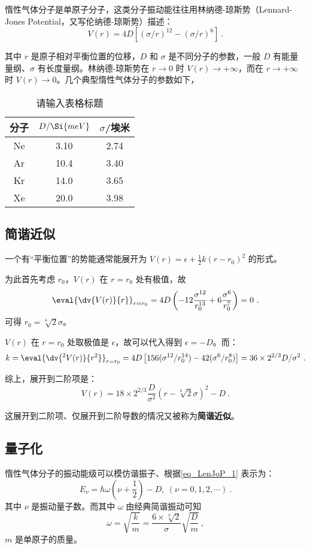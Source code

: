 
惰性气体分子是单原子分子，这类分子振动能往往用林纳德-琼斯势（Lennard-Jones Potential，又写伦纳德-琼斯势）描述：
\begin{equation}
V(r) = 4 D\left[(\sigma / r)^{12} - (\sigma/r)^6\right] ~.
\end{equation}

其中 $r$ 是原子相对平衡位置的位移，$D$ 和 $\sigma$ 是不同分子的参数，一般 $D$ 有能量量纲、$\sigma$ 有长度量纲。林纳德-琼斯势在 $r \rightarrow 0$ 时 $V(r) \rightarrow +\infty$，而在 $r \rightarrow +\infty$ 时 $V(r) \rightarrow 0$。几个典型惰性气体分子的参数如下，
\begin{table}[ht]
\centering
\caption{请输入表格标题}\label{tab_LenJoP1}
\begin{tabular}{|c|c|c|}
\hline
分子 & $D/\Si{meV}$ & $\sigma$/埃米 \\
\hline
Ne & 3.10 & 2.74 \\
\hline
Ar & 10.4 & 3.40 \\
\hline
Kr & 14.0 & 3.65 \\
\hline
Xe & 20.0 & 3.98 \\
\hline
\end{tabular}
\end{table}


\subsection{简谐近似}
一个有“平衡位置”的势能通常能展开为 $V(r) = \epsilon + \frac{1}2 k (r-r_0)^2$ 的形式。

为此首先考虑 $r_0$，$V(r)$ 在 $r=r_0$ 处有极值，故
$$\eval{\dv{V(r)}{r}} _{r=r_0} = 4D\left(-12 \frac{\sigma^{12}}{r_0 ^{13}} + 6 \frac{\sigma^6}{r_0^7}\right) = 0~.$$
可得 $r_0 = \sqrt[6]{2} \sigma$。

$V(r)$ 在 $r=r_0$ 处取极值是 $\epsilon$，故可以代入得到 $\epsilon = -D$。而：
$$k = \eval{\dv{^2 V(r)}{r^2}}_{r=r_0} = 4 D \left[156 (\sigma^{12} / r_0^{14}) - 42 (\sigma^{6}/r_0^{8})\right] = 36 \times 2^{2/3} D/\sigma^2 ~.$$

综上，展开到二阶项是：
\begin{equation}\label{eq_LenJoP_1}
V(r) = 18 \times 2^{2/3} \frac{D}{\sigma^2} (r - \sqrt[6]{2} \sigma)^2 - D ~.
\end{equation}

这展开到二阶项、仅展开到二阶导数的情况又被称为\textbf{简谐近似}。
\subsection{量子化}\label{sub_LenJoP_1}
惰性气体分子的振动能级可以模仿谐振子、根据\autoref{eq_LenJoP_1} 表示为：
\begin{equation}
E_\nu = \hbar \omega \left(\nu + \frac12\right) - D,  \ (\nu = 0, 1, 2, \cdots) ~.
\end{equation}
其中 $\nu$ 是振动量子数。而其中 $\omega$ 由经典简谐振动可知
\begin{equation}
\omega = \sqrt{\frac km} = \frac{6 \times \sqrt[3]{2}}{\sigma}\sqrt{\frac Dm} ~,
\end{equation} 
$m$ 是单原子的质量。